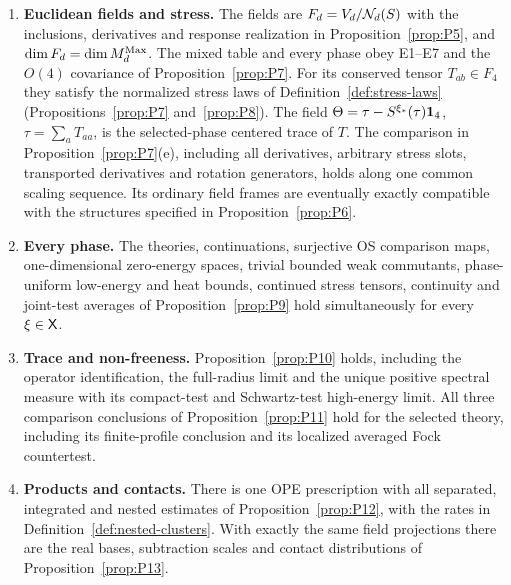 \begin{theorem}
\begin{enumerate}[resume,label=\textup{B\arabic*.},leftmargin=2.7em,itemsep=0.35em,topsep=0.35em]
\item \textup{\textbf{Euclidean fields and stress.}} The fields are $F_d=V_d/\mathcal{N}_{d}(S)$ with the inclusions, derivatives and response realization in Proposition~\ref{prop:P5}, and $\dim F_d=\dim M_{d}^{\mathrm{Max}}$. The mixed table and every phase obey E1–E7 and the $O(4)$ covariance of Proposition~\ref{prop:P7}. For its conserved tensor $T_{ab}\in F_4$ they satisfy the normalized stress laws of Definition~\ref{def:stress-laws} (Propositions~\ref{prop:P7} and~\ref{prop:P8}). The field $\Theta=\tau-S^{\xi_*}(\tau)\mathbf{1}_{4}$, $\tau=\sum_aT_{aa}$, is the selected-phase centered trace of $T$. The comparison in Proposition~\ref{prop:P7}(e), including all derivatives, arbitrary stress slots, transported derivatives and rotation generators, holds along one common scaling sequence. Its ordinary field frames are eventually exactly compatible with the structures specified in Proposition~\ref{prop:P6}.

\item \textup{\textbf{Every phase.}} The theories, continuations, surjective OS comparison maps, one-dimensional zero-energy spaces, trivial bounded weak commutants, phase-uniform low-energy and heat bounds, continued stress tensors, continuity and joint-test averages of Proposition~\ref{prop:P9} hold simultaneously for every $\xi\in\mathsf{X}$.

\item \textup{\textbf{Trace and non-freeness.}} Proposition~\ref{prop:P10} holds, including the operator identification, the full-radius limit and the unique positive spectral measure with its compact-test and Schwartz-test high-energy limit. All three comparison conclusions of Proposition~\ref{prop:P11} hold for the selected theory, including its finite-profile conclusion and its localized averaged Fock countertest.

\item \textup{\textbf{Products and contacts.}} There is one OPE prescription with all separated, integrated and nested estimates of Proposition~\ref{prop:P12}, with the rates in Definition~\ref{def:nested-clusters}. With exactly the same field projections there are the real bases, subtraction scales and contact distributions of Proposition~\ref{prop:P13}.

\end{enumerate}
\end{theorem}

